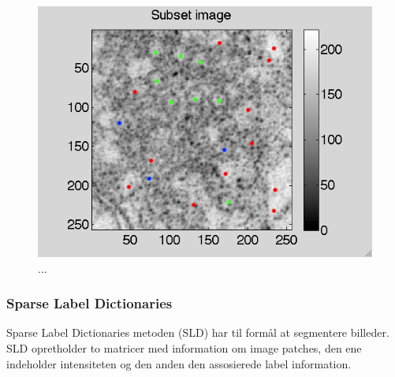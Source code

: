 \begin{figure}[H]
		\centering
		\includegraphics[scale=0.9]{files/postmethod/img/ves1+2_th-34_res.png}
	\caption{...\label{fig:postmethod_conv_ves_2}}
\end{figure}

\subsubsection{Sparse Label Dictionaries}	%



Sparse Label Dictionaries metoden (SLD) har til formål at segmentere billeder. SLD opretholder to matricer med information om image patches, den ene indeholder intensiteten og den anden den assosierede label information.

